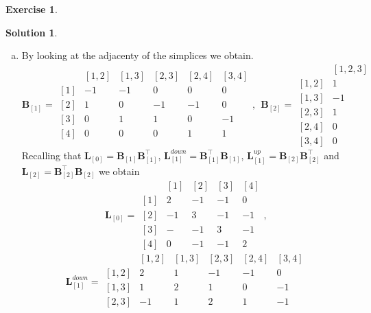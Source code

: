 \documentclass{article}
\theoremstyle{plain}
\theoremstyle{definition}
\newtheorem{exercise}{Exercise}
\newtheorem*{sol*}{Solution}
\begin{document}
\begin{exercise}
\end{exercise}
\begin{sol*}\
\begin{enumerate}[(a)]
\item By looking at the adjacenty of the simplices we obtain.
\[
\mathbf{B}_{[1]} = \begin{matrix}
  & [1, 2] &   [1, 3] &    [2, 3] &    [2, 4] &   [3, 4] \\
[1]&  -1     &    -1     &     0     &    0     &    0   \\
[2]&   1     &     0     &    -1     &   -1     &    0   \\
[3]&   0     &     1     &     1     &    0     &   -1   \\
[4]&   0     &     0     &     0     &    1     &    1
\end{matrix},\ \
\mathbf{B}_{[2]} = \begin{matrix}
   & [1, 2, 3] \\
[1,2]&   1     \\
[1,3]&  -1     \\
[2,3]&   1     \\
[2,4]&   0     \\
[3,4]&   0      
\end{matrix}
\]
Recalling that $\mathbf{L}_{[0]} = \mathbf{B}_{[1]}\mathbf{B}_{[1]}^{\top}$, $\mathbf{L}_{[1]}^{down}=\mathbf{B}_{[1]}^{\top}\mathbf{B}_{[1]}$, $\mathbf{L}_{[1]}^{up}=\mathbf{B}_{[2]}\mathbf{B}_{[2]}^{\top}$ and $\mathbf{L}_{[2]}=\mathbf{B}_{[2]}^{\top}\mathbf{B}_{[2]}$ we obtain
\[
\mathbf{L}_{[0]} = \begin{matrix}
  & [1] &   [2] &    [3] &    [4] \\
[1]&  2     &    -1     &     -1     &    0      \\
[2]&   -1     &     3     &    -1     &   -1      \\
[3]&   -     &     -1     &     3     &    -1       \\
[4]&   0     &      -1    &     -1     &    2   
\end{matrix},\]
\[
 \mathbf{L}_{[1]}^{down} = \begin{matrix}
  & [1, 2] &   [1, 3] &    [2, 3] &    [2, 4] &   [3, 4] \\
[1,2]&  2     &    1     &     -1    &    -1     &    0   \\
[1,3]&   1     &     2    &    1     &   0     &    -1   \\
[2,3]&   -1    &     1     &     2     &    1     &   -1   \\

\end{matrix}\]
\end{enumerate}
\end{sol*}
\end{document}
